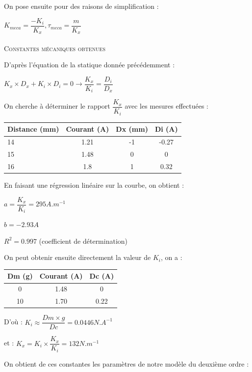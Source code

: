 \documentclass[11pt, french]{article} %
\begin{document}
\noindent
On pose ensuite pour des raisons de simplification :

 \medskip
$ K_{meca} = \dfrac{-K_i}{K_x}, \tau_{meca} = \dfrac{m}{K_x} $

\paragraph{}
\textsc{Constantes mécaniques obtenues}

\noindent
D'après l'équation de la statique donnée précédemment :

 \medskip
$ K_x \times D_x + K_i \times D_i = 0 \rightarrow \dfrac{K_x}{K_i} = \dfrac{D_i}{D_x} $
 \medskip

\noindent
On cherche à déterminer le rapport $ \dfrac{K_x}{K_i} $ avec les mesures effectuées :

\medskip
\begin{tabular} {|l|c|c|c|}
	 \hline
	\textbf{Distance (mm)} & \textbf{Courant (A)} & \textbf{Dx (mm)} & \textbf{Di (A)} \\ \hline
	14 & 1.21 &  -1 & -0.27 \\ \hline
	15 & 1.48 & 0 & 0 \\ \hline
	16 & 1.8 & 1 & 0.32 \\ \hline
\end{tabular}

\medskip
\noindent
En faisant une régression linéaire sur la courbe, on obtient :

\medskip
$ a = \dfrac{K_x}{K_i} = 295 A.m^{-1} $

\medskip
$ b = - 2.93 A $

\medskip
$ R^2 = 0.997 $ (coefficient de détermination)
\medskip

\noindent
On peut obtenir ensuite directement la valeur de $ K_i $, on a :

\medskip
\begin{tabular} {|c|c|c|}
	 \hline
	\textbf{Dm (g)} & \textbf{Courant (A)} & \textbf{Dc (A)} \\ \hline
	0 & 1.48 &  0 \\ \hline
	10 & 1.70 & 0.22 \\ \hline
\end{tabular}

\medskip
D'où : $ K_i \approx \dfrac{Dm \times g}{Dc} = 0.0446 N.A^{-1} $

\medskip
et : $ K_x = K_i \times \dfrac{K_x}{K_i} = 132 N.m ^{-1} $

\medskip
\noindent
On obtient de ces constantes les paramètres de notre modèle du deuxième ordre :
\end{document}
